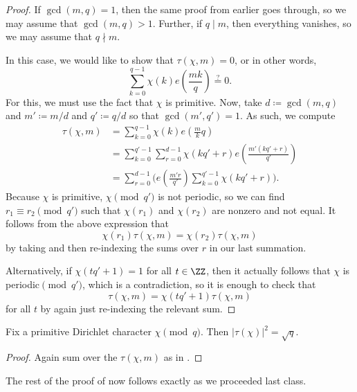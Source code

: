 \documentclass[../notes.tex]{subfiles}
\begin{document}
\begin{proof}
	If $\gcd(m,q)=1$, then the same proof from earlier goes through, so we may assume that $\gcd(m,q)>1$. Further, if $q\mid m$, then everything vanishes, so we may assume that $q\nmid m$.

	In this case, we would like to show that $\tau(\chi,m)=0$, or in other words,
	\[\sum_{k=0}^{q-1}\chi(k)e\left(\frac{mk}q\right)\stackrel?=0.\]
	For this, we must use the fact that $\chi$ is primitive. Now, take $d\coloneqq\gcd(m,q)$ and $m'\coloneqq m/d$ and $q'\coloneqq q/d$ so that $\gcd(m',q')=1$. As such, we compute
	\begin{align*}
		\tau(\chi,m) &= \sum_{k=0}^{q-1}\chi(k)e\left(\frac mkq\right) \\
		&= \sum_{k=0}^{q'-1}\sum_{r=0}^{d-1}\chi(kq'+r)e\left(\frac{m'(kq'+r)}{q'}\right) \\
		&= \sum_{r=0}^{d-1}\Bigg(e\left(\frac{m'r}{q'}\right)\sum_{k=0}^{q'-1}\chi(kq'+r)\Bigg).
	\end{align*}
	Because $\chi$ is primitive, $\chi\pmod{q'}$ is not periodic, so we can find $r_1\equiv r_2\pmod{q'}$ such that $\chi(r_1)$ and $\chi(r_2)$ are nonzero and not equal. It follows from the above expression that
	\[\chi(r_1)\tau(\chi,m)=\chi(r_2)\tau(\chi,m)\]
	by taking and then re-indexing the sums over $r$ in our last summation.

	Alternatively, if $\chi(tq'+1)=1$ for all $t\in\ZZ$, then it actually follows that $\chi$ is periodic$\pmod{q'}$, which is a contradiction, so it is enough to check that
	\[\tau(\chi,m)=\chi(tq'+1)\tau(\chi,m)\]
	for all $t$ by again just re-indexing the relevant sum.
\end{proof}
\begin{lemma}
	Fix a primitive Dirichlet character $\chi\pmod q$. Then $|\tau(\chi)|^2=\sqrt q$.
\end{lemma}
\begin{proof}
	Again sum over the $\tau(\chi,m)$ as in .
\end{proof}
The rest of the proof of  now follows exactly as we proceeded last class.
\end{document}
